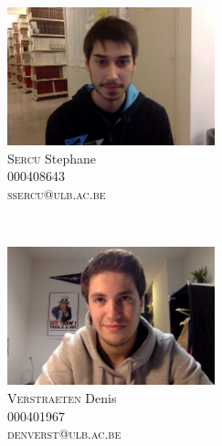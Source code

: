 \documentclass[11pt,a4paper,11pt]{report}
\begin{document}
\begin{minipage}{0.45\textwidth}
\begin{flushleft} 
\includegraphics[height=4cm] {photos_membres/Stephane.jpg}\\
\textsc{Sercu} Stephane\\
\textsc{000408643}\\
\textsc{ssercu@ulb.ac.be}\\
\end{flushleft}
\end{minipage}
~
\begin{minipage}{0.45\textwidth}
\begin{flushright}
\includegraphics[height=4cm]{photos_membres/Denis.jpg}\\
\textsc{Verstraeten} Denis\\
\textsc{000401967}\\
\textsc{denverst@ulb.ac.be}\\
\end{flushright}
\end{minipage}

\newpage




\appendix

\end{document}
